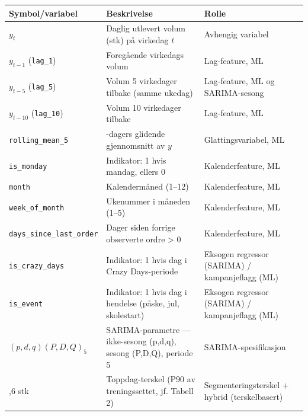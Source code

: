\documentclass[
  norsk,
  11pt,
  a4paper,
]{article}
\newcounter{none} %
\begin{document}
{\def\LTcaptype{none} %
\begin{longtable}[]{@{}
  >{\raggedright\arraybackslash}p{}
  >{\raggedright\arraybackslash}p{}
  >{\raggedright\arraybackslash}p{}@{}}
\toprule\noalign{}
\begin{minipage}[b]{\linewidth}\raggedright
Symbol/variabel
\end{minipage} & \begin{minipage}[b]{\linewidth}\raggedright
Beskrivelse
\end{minipage} & \begin{minipage}[b]{\linewidth}\raggedright
Rolle
\end{minipage} \\
\midrule\noalign{}
\endhead
\bottomrule\noalign{}
\endlastfoot
\(y_t\) & Daglig utlevert volum (stk) på virkedag \(t\) & Avhengig
variabel \\
\(y_{t-1}\) (\texttt{lag\_1}) & Foregående virkedags volum &
Lag-feature, ML \\
\(y_{t-5}\) (\texttt{lag\_5}) & Volum 5 virkedager tilbake (samme
ukedag) & Lag-feature, ML og SARIMA-sesong \\
\(y_{t-10}\) (\texttt{lag\_10}) & Volum 10 virkedager tilbake &
Lag-feature, ML \\
\texttt{rolling\_mean\_5} & 5-dagers glidende gjennomsnitt av \(y\) &
Glattingsvariabel, ML \\
\texttt{is\_monday} & Indikator: 1 hvis mandag, ellers 0 &
Kalenderfeature, ML \\
\texttt{month} & Kalendermåned (1--12) & Kalenderfeature, ML \\
\texttt{week\_of\_month} & Ukenummer i måneden (1--5) & Kalenderfeature,
ML \\
\texttt{days\_since\_last\_order} & Dager siden forrige observerte ordre
\textgreater{} 0 & Kalenderfeature, ML \\
\texttt{is\_crazy\_days} & Indikator: 1 hvis dag i Crazy Days-periode &
Eksogen regressor (SARIMA) / kampanjeflagg (ML) \\
\texttt{is\_event} & Indikator: 1 hvis dag i hendelse (påske, jul,
skolestart) & Eksogen regressor (SARIMA) / kampanjeflagg (ML) \\
\((p,d,q)(P,D,Q)_5\) & SARIMA-parametre --- ikke-sesong (p,d,q), sesong
(P,D,Q), periode 5 & SARIMA-spesifikasjon \\
70,6 stk & Toppdag-terskel (P90 av treningssettet, jf. Tabell 2) &
Segmenteringsterskel + hybrid (terskelbasert) \\
\end{longtable}
}
\end{document}
